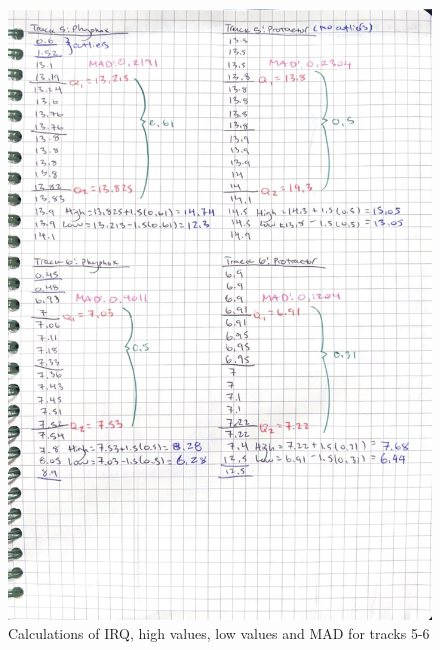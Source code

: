 \documentclass[idxtotoc,hyperref,openany]{labbook} %
\begin{document}
\begin{figure}[H] %
\begin{center}
\includegraphics[width=0.9\linewidth]{images/Lab.01/PhyProTrack5-6.png}
\end{center}
\caption{Calculations of IRQ, high values, low values and MAD for tracks 5-6}
\label{fig:Track5-6PhyphoxProtractor}
\end{figure}
\end{document}
